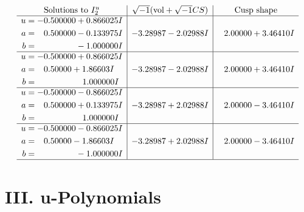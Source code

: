 \documentclass[1p]{elsarticle_modified}
\theoremstyle{definition}
\newcommand{\I}{\sqrt{-1}}
\begin{document}
$$\begin{array}{c|c|c}  
\text{Solutions to }I^u_{2}& \I (\text{vol} + \sqrt{-1}CS) & \text{Cusp shape}\\
 \hline 
\begin{aligned}
u &= -0.500000 + 0.866025 I \\
a &= \phantom{-}0.500000 - 0.133975 I \\
b &= \phantom{-0.000000 } -1.000000 I\end{aligned}
 & -3.28987 - 2.02988 I & \phantom{-}2.00000 + 3.46410 I \\ \hline\begin{aligned}
u &= -0.500000 + 0.866025 I \\
a &= \phantom{-}0.50000 + 1.86603 I \\
b &= \phantom{-0.000000 -}1.000000 I\end{aligned}
 & -3.28987 - 2.02988 I & \phantom{-}2.00000 + 3.46410 I \\ \hline\begin{aligned}
u &= -0.500000 - 0.866025 I \\
a &= \phantom{-}0.500000 + 0.133975 I \\
b &= \phantom{-0.000000 -}1.000000 I\end{aligned}
 & -3.28987 + 2.02988 I & \phantom{-}2.00000 - 3.46410 I \\ \hline\begin{aligned}
u &= -0.500000 - 0.866025 I \\
a &= \phantom{-}0.50000 - 1.86603 I \\
b &= \phantom{-0.000000 } -1.000000 I\end{aligned}
 & -3.28987 + 2.02988 I & \phantom{-}2.00000 - 3.46410 I\\
 \hline 
 \end{array}$$\newpage
\newpage\renewcommand{\arraystretch}{1}
\centering \section*{ III. u-Polynomials}
\end{document}

